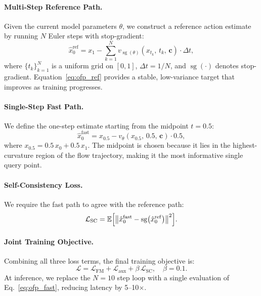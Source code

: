 \documentclass[10pt,twocolumn]{article}
\newcommand{\cond}{\mathbf{c}}
\newcommand{\sg}{\operatorname{sg}}  %
\begin{document}
\paragraph{Multi-Step Reference Path.}
Given the current model parameters $\theta$, we construct a reference action
estimate by running $N$ Euler steps with stop-gradient:
\begin{equation}
  \hat{x}_0^{\mathrm{ref}} = x_1 -
  \sum_{k=1}^{N}
  v_{\sg(\theta)}\!\left(x_{t_k},\, t_k,\, \cond\right) \cdot \Delta t,
  \label{eq:ofp_ref}
\end{equation}
where $\{t_k\}_{k=1}^{N}$ is a uniform grid on $[0,1]$,
$\Delta t = 1/N$, and $\sg(\cdot)$ denotes stop-gradient.
Equation~\eqref{eq:ofp_ref} provides a stable, low-variance target that
improves as training progresses.

\paragraph{Single-Step Fast Path.}
We define the one-step estimate starting from the midpoint $t{=}0.5$:
\begin{equation}
  \hat{x}_0^{\mathrm{fast}} =
  x_{0.5} - v_\theta\!\left(x_{0.5},\, 0.5,\, \cond\right) \cdot 0.5,
  \label{eq:ofp_fast}
\end{equation}
where $x_{0.5} = 0.5\,x_0 + 0.5\,x_1$.
The midpoint is chosen because it lies in the highest-curvature region
of the flow trajectory, making it the most informative single query point.

\paragraph{Self-Consistency Loss.}
We require the fast path to agree with the reference path:
\begin{equation}
  \mathcal{L}_{\mathrm{SC}} =
  \mathbb{E}\Bigl[
    \bigl\|\hat{x}_0^{\mathrm{fast}} -
    \sg\!\left(\hat{x}_0^{\mathrm{ref}}\right)\bigr\|^2
  \Bigr].
  \label{eq:ofp_sc}
\end{equation}

\paragraph{Joint Training Objective.}
Combining all three loss terms, the final training objective is:
\begin{equation}
  \mathcal{L} =
  \mathcal{L}_{\mathrm{FM}}
  + \mathcal{L}_{\mathrm{aux}}
  + \beta\, \mathcal{L}_{\mathrm{SC}},
  \quad \beta = 0.1.
  \label{eq:loss_full}
\end{equation}
At inference, we replace the $N{=}10$ step loop with a single evaluation of
Eq.~\eqref{eq:ofp_fast}, reducing latency by 5--10$\times$.
\end{document}
